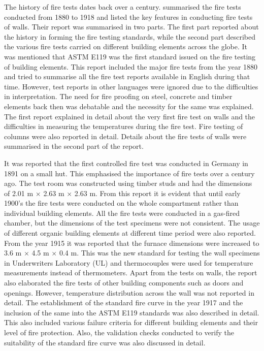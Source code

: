 The history of fire tests dates back over a century. \citet{Babrauskas1978} summarised the fire tests conducted from 1880 to 1918 and listed the key features in conducting fire tests of walls. Their report was summarised in two parts. The first part reported about the history in forming the fire testing standards, while the second part described the various fire tests carried on different building elements across the globe. It was mentioned that ASTM E119 was the first standard issued on the fire testing of building elements. This report included the major fire tests from the year 1880 and tried to summarise all the fire test reports available in English during that time. However, test reports in other languages were ignored due to the difficulties in interpretation. The need for fire proofing on steel, concrete and timber elements back then was debatable and the necessity for the same was explained. The first report explained in detail about the very first fire test on walls and the difficulties in measuring the temperatures during the fire test. Fire testing of columns were also reported in detail. Details about the fire tests of walls were summarised in the second part of the report.  

It was reported that the first controlled fire test was conducted in Germany in 1891 on a small hut. This emphasised the importance of fire tests over a century ago. The test room was constructed using timber studs and had the dimensions of 2.01 m $\times$ 2.63 m $\times$ 2.63 m. From this report it is evident that until early 1900's the fire tests were conducted on the whole compartment rather than individual building elements. All the fire tests were conducted in a gas-fired chamber, but the dimensions of the test specimens were not consistent. The usage of different organic building elements at different time period were also reported. From the year 1915 it was reported that the furnace dimensions were increased to 3.6 m $\times$ 4.5 m $\times$ 0.4 m. This was the new standard for testing the wall specimens in Underwriters Laboratory (UL) and thermocouples were used for temperature measurements instead of thermometers. Apart from the tests on walls, the report also elaborated the fire tests of other building components such as doors and openings. However, temperature distribution across the wall was not reported in detail. The establishment of the standard fire curve in the year 1917 and the inclusion of the same into the ASTM E119 standards was also described in detail. This also included various failure criteria for different building elements and their level of fire protection. Also, the validation checks conducted to verify the suitability of the standard fire curve was also discussed in detail.

